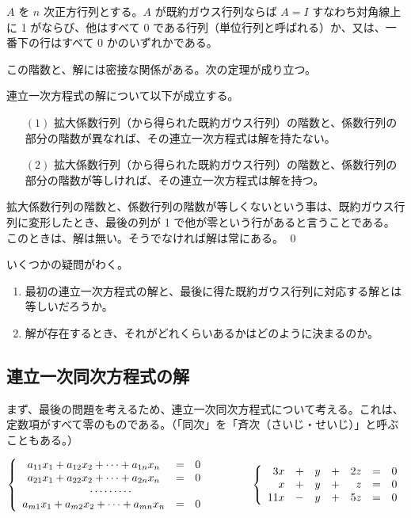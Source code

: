 \begin{eg}
$A$ を $n$ 次正方行列とする。$A$ が既約ガウス行列ならば $A = I$ すなわち対角線上に 1 がならび、他はすべて 0 である行列（単位行列と呼ばれる）か、又は、一番下の行はすべて 0 かのいずれかである。
\end{eg}

この階数と、解には密接な関係がある。次の定理が成り立つ。
\begin{thm}\label{thm:lineqbasic1}
連立一次方程式の解について以下が成立する。
\begin{itemize}
\item[$(1)$] 拡大係数行列（から得られた既約ガウス行列）の階数と、係数行列の部分の階数が異なれば、その連立一次方程式は解を持たない。
\item[$(2)$] 拡大係数行列（から得られた既約ガウス行列）の階数と、係数行列の部分の階数が等しければ、その連立一次方程式は解を持つ。
\end{itemize}
\end{thm}
\proof
拡大係数行列の階数と、係数行列の階数が等しくないという事は、既約ガウス行列に変形したとき、最後の列が 1 で他が零という行があると言うことである。このときは、解は無い。そうでなければ解は常にある。
\qed

\bigskip
いくつかの疑問がわく。
\begin{enumerate}
\item 最初の連立一次方程式の解と、最後に得た既約ガウス行列に対応する解とは等しいだろうか。
\item 解が存在するとき、それがどれくらいあるかはどのように決まるのか。
\end{enumerate}

\subsection{連立一次同次方程式の解}
まず、最後の問題を考えるため、連立一次{\gt 同次}方程式について考える。これは、定数項がすべて零のものである。（「同次」を「斉次（さいじ・せいじ）」と呼ぶこともある。）

$$\left\{\begin{array}{ccc}
a_{11}x_1 + a_{12}x_2 + \cdots + a_{1n}x_n & = & 0\\
a_{21}x_1 + a_{22}x_2 + \cdots + a_{2n}x_n & = & 0\\
\multicolumn{3}{c}{\cdots\cdots\cdots} \\
a_{m1}x_1 + a_{m2}x_2 + \cdots + a_{mn}x_n & = & 0
\end{array}\right.\qquad\qquad 
\left\{\begin{array}{rrrrrrr}
3x & + & y  & + & 2z & = & 0\\
x & + & y & + & z & = & 0\\
11x & - & y & + & 5z & = & 0
\end{array}\right.$$

